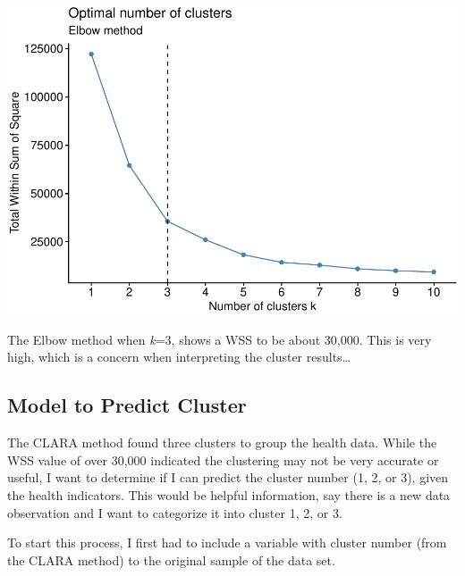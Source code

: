 \documentclass[12pt,twoside]{amherstthesis}
\begin{document}
  \begin{center}\includegraphics{Comps_Proj_files/figure-latex/unnamed-chunk-11-1} \end{center}
  
  The Elbow method when \emph{k}=3, shows a WSS to be about 30,000. This
  is very high, which is a concern when interpreting the cluster
  results\ldots{}
  
  \subsection{Model to Predict Cluster}\label{model-to-predict-cluster}
  
  The CLARA method found three clusters to group the health data. While
  the WSS value of over 30,000 indicated the clustering may not be very
  accurate or useful, I want to determine if I can predict the cluster
  number (1, 2, or 3), given the health indicators. This would be helpful
  information, say there is a new data observation and I want to
  categorize it into cluster 1, 2, or 3.
  
  To start this process, I first had to include a variable with cluster
  number (from the CLARA method) to the original sample of the data set.
  
  \begin{Shaded}
  \begin{Highlighting}[]
  \StringTok{ }\OperatorTok{$}
  \StringTok{ }
  \end{Highlighting}
  \end{Shaded}
  
\end{document}
